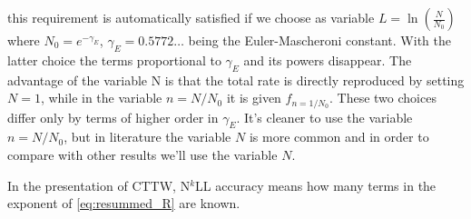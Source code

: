 \documentclass[../main.tex]{subfiles}
\begin{document}
this requirement is automatically satisfied if we choose as variable $L = \ln(\frac{N}{N_0})$ where $N_0 = e^{-\gamma_E}$, $\gamma_E = 0.5772 \dots $ being the Euler-Mascheroni constant.
With the latter choice the terms proportional to $\gamma_E$ and its powers disappear. The advantage of the variable N is that the total rate is directly reproduced by setting $N=1$, while
in the variable $n=N/N_0$ it is given $f_{n=1/N_0}$. These two choices differ only by terms of higher order in $\gamma_E$.
It's cleaner to use the variable $n=N/N_0$, but in literature the variable $N$ is more common and in order to compare with other results we'll use the variable $N$.

In the presentation of CTTW, N$^k$LL accuracy means how many terms in the exponent of \cref{eq:resummed_R} are known.
\end{document}
